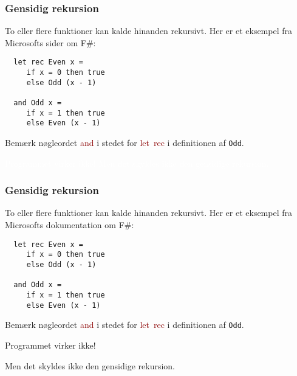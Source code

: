\documentclass{beamer}
\begin{document}
\begin{frame}[fragile=singleslide]
\frametitle{Gensidig rekursion}

To eller flere funktioner kan kalde hinanden rekursivt.  Her er et
eksempel fra Microsofts sider om F\#:

\begin{verbatim}
  let rec Even x =
     if x = 0 then true
     else Odd (x - 1)

  and Odd x =
     if x = 1 then true
     else Even (x - 1)
\end{verbatim}

Bemærk nøgleordet \textcolor{darkred}{and} i stedet for
\textcolor{darkred}{let~rec} i definitionen af \texttt{Odd}.



\vspace{1ex}
\textcolor{white}{Programmet virker ikke!  Men det skyldes ikke den gensidige rekursion.}

\end{frame}
\begin{frame}[fragile=singleslide]
\frametitle{Gensidig rekursion}

To eller flere funktioner kan kalde hinanden rekursivt.  Her er et
eksempel fra Microsofts dokumentation om F\#:

\begin{verbatim}
  let rec Even x =
     if x = 0 then true
     else Odd (x - 1)

  and Odd x =
     if x = 1 then true
     else Even (x - 1)
\end{verbatim}

Bemærk nøgleordet \textcolor{darkred}{and} i stedet for
\textcolor{darkred}{let~rec} i definitionen af \texttt{Odd}.

\vspace{1ex}
Programmet virker ikke!

Men det skyldes ikke den gensidige rekursion.

\end{frame}
\end{document}

